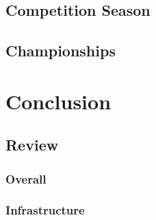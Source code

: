 \documentclass[11pt]{report}
\begin{document}
\section{Competition Season}
\section{Championships}


\chapter{Conclusion}

\section{Review}
\subsection{Overall}
\subsection{Infrastructure}


\printbibliography[heading=bibintoc]
\end{document}
